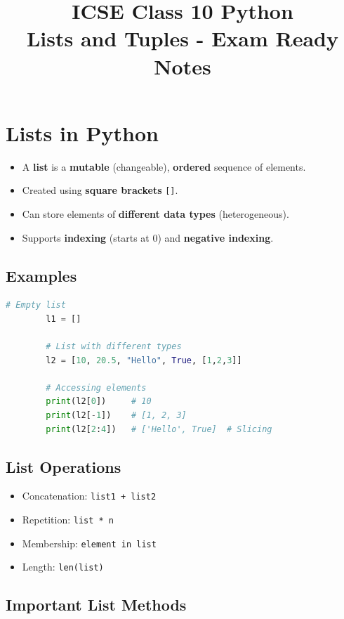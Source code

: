 \documentclass{article}
\title{ICSE Class 10 Python \\ Lists and Tuples - Exam Ready Notes}
\author{}
\date{}
\begin{document}
	
	\maketitle
	
	\section{Lists in Python}
	
	\begin{itemize}
		\item A \textbf{list} is a \textbf{mutable} (changeable), \textbf{ordered} sequence of elements.
		\item Created using \textbf{square brackets} \texttt{[]}.
		\item Can store elements of \textbf{different data types} (heterogeneous).
		\item Supports \textbf{indexing} (starts at 0) and \textbf{negative indexing}.
	\end{itemize}
	
	\subsection{Examples}
	\begin{lstlisting}[language=Python]
		# Empty list
		l1 = []
		
		# List with different types
		l2 = [10, 20.5, "Hello", True, [1,2,3]]
		
		# Accessing elements
		print(l2[0])     # 10
		print(l2[-1])    # [1, 2, 3]
		print(l2[2:4])   # ['Hello', True]  # Slicing
	\end{lstlisting}
	
	\subsection{List Operations}
	\begin{itemize}
		\item Concatenation: \texttt{list1 + list2}
		\item Repetition: \texttt{list * n}
		\item Membership: \texttt{element in list}
		\item Length: \texttt{len(list)}
	\end{itemize}
	
	\subsection{Important List Methods}
	
\end{document}
